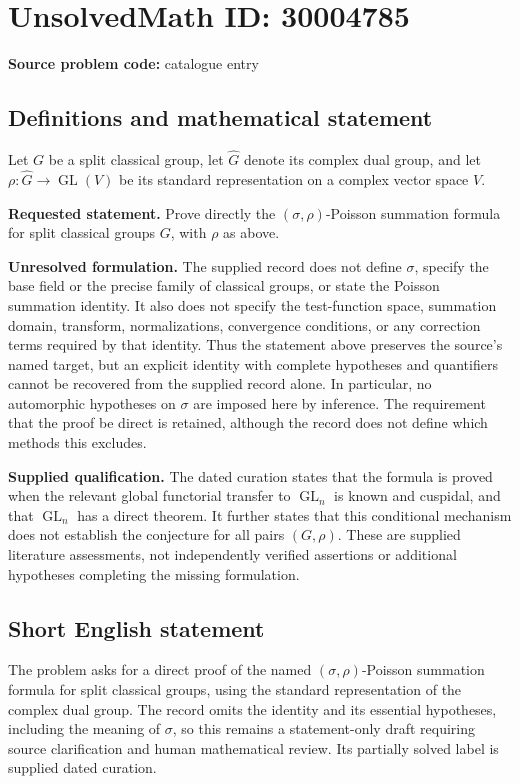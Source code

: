 \documentclass[11pt]{article}
\begin{document}
\section*{UnsolvedMath ID: 30004785}
\textbf{Source problem code:} catalogue entry
\subsection{Definitions and mathematical statement}
Let \(G\) be a split classical group, let \(\widehat G\) denote its complex dual group, and let \(\rho\colon\widehat G\to\operatorname{GL}(V)\) be its standard representation on a complex vector space \(V\).

\textbf{Requested statement.} Prove directly the \((\sigma,\rho)\)-Poisson summation formula for split classical groups \(G\), with \(\rho\) as above.

\textbf{Unresolved formulation.} The supplied record does not define \(\sigma\), specify the base field or the precise family of classical groups, or state the Poisson summation identity. It also does not specify the test-function space, summation domain, transform, normalizations, convergence conditions, or any correction terms required by that identity. Thus the statement above preserves the source's named target, but an explicit identity with complete hypotheses and quantifiers cannot be recovered from the supplied record alone. In particular, no automorphic hypotheses on \(\sigma\) are imposed here by inference. The requirement that the proof be direct is retained, although the record does not define which methods this excludes.

\textbf{Supplied qualification.} The dated curation states that the formula is proved when the relevant global functorial transfer to \(\operatorname{GL}_n\) is known and cuspidal, and that \(\operatorname{GL}_n\) has a direct theorem. It further states that this conditional mechanism does not establish the conjecture for all pairs \((G,\rho)\). These are supplied literature assessments, not independently verified assertions or additional hypotheses completing the missing formulation.
\subsection{Short English statement}
The problem asks for a direct proof of the named \((\sigma,\rho)\)-Poisson summation formula for split classical groups, using the standard representation of the complex dual group. The record omits the identity and its essential hypotheses, including the meaning of \(\sigma\), so this remains a statement-only draft requiring source clarification and human mathematical review. Its partially solved label is supplied dated curation.
\end{document}
